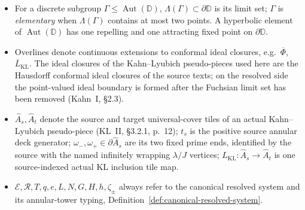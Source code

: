 \documentclass[11pt,reqno]{amsart}
\theoremstyle{definition}
\theoremstyle{remark}
\begin{document}
\begin{itemize}
\item For a discrete subgroup \(\Gamma\le\operatorname{Aut}(\mathbb D)\), \(\Lambda(\Gamma)\subset\partial\mathbb D\) is its limit set; \(\Gamma\) is \emph{elementary} when \(\Lambda(\Gamma)\) contains at most two points.  A hyperbolic element of \(\operatorname{Aut}(\mathbb D)\) has one repelling and one attracting fixed point on \(\partial\mathbb D\).

\item Overlines denote continuous extensions to conformal ideal closures, e.g.\ \(\overline\Phi\), \(\overline L_{\mathrm{KL}}\).  The ideal closures of the Kahn--Lyubich pseudo-pieces used here are the Hausdorff conformal ideal closures of the source texts; on the resolved side the point-valued ideal boundary is formed after the Fuchsian limit set has been removed (Kahn~I, \S2.3).

\item \(\widehat A_s,\widehat A_t\) denote the source and target universal-cover tiles of an actual Kahn--Lyubich pseudo-piece (KL~II, \S3.2.1, p.~12); \(t_s\) is the positive source annular deck generator; \(\omega_-,\omega_+\in\partial\widehat A_s\) are its two fixed prime ends, identified by the source with the named infinitely wrapping \(\lambda/J\) vertices; \(L_{\mathrm{KL}}\colon\widehat A_s\to\widehat A_t\) is one source-indexed actual KL inclusion tile map.

\item \(\mathcal E,\mathcal R,T,q,e,L,N,G,H,h,\zeta_\pm\) always refer to the canonical resolved system and its annular-tower typing, Definition~\ref{def:canonical-resolved-system}.
\end{itemize}
\end{document}

